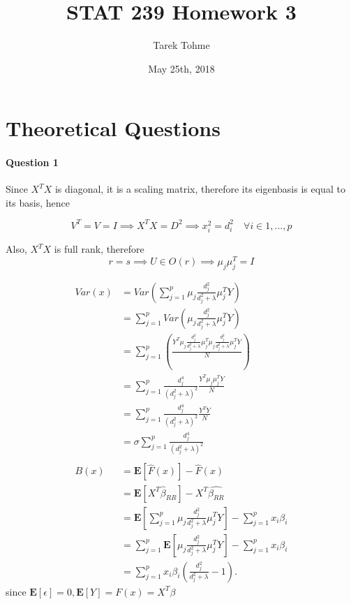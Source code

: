 \documentclass{article}
\begin{document}
\title{STAT 239 Homework 3}
\author{Tarek Tohme}
\date{May 25th, 2018}
\maketitle

\section{Theoretical Questions}
\paragraph{Question 1}

Since \(X^TX\) is diagonal, it is a scaling matrix, therefore its eigenbasis is equal to its basis, hence 

\begin{equation*}
V^T = V = I \implies X^TX = D^2 \implies x_i^2 = d_i^2 \quad \forall i \in {1,...,p}
\end{equation*}

Also, \(X^TX\) is full rank, therefore 
\begin{equation*}
r=s \implies U \in O(r) \implies \mu_j\mu_j^T = I
\end{equation*}

\begin{align*}
Var(x) & = Var\left(\sum_{j=1}^p\mu_j\frac{d_j^2}{d_j^2 + \lambda}\mu_j^TY\right)
\\
& = \sum_{j=1}^pVar\left(\mu_j\frac{d_j^2}{d_j^2 + \lambda}\mu_j^TY\right)
\\
& = \sum_{j=1}^p\left(\frac{Y^T\mu_j\frac{d_j^2}{d_j^2 + \lambda}\mu_j^T\mu_j\frac{d_j^2}{d_j^2 + \lambda}\mu_j^TY}{N}\right)
\\
& = \sum_{j=1}^p\frac{d_j^4}{\left(d_j^2 + \lambda\right)^2}\frac{Y^T\mu_j\mu_j^TY}{N}
\\
& = \sum_{j=1}^p\frac{d_j^4}{\left(d_j^2 + \lambda\right)^2}\frac{Y^TY}{N}
\\
& = \sigma \sum_{j=1}^p\frac{d_j^4}{\left(d_j^2 + \lambda\right)^2}
\\
\\
B(x) & = \mathbf{E}\left[\hat{F}(x)\right] - \hat{F}(x)
\\
& = \mathbf{E}\left[X^T\hat{\beta}_{RR}\right] - X^T\hat{\beta_{RR}}
\\
& = \mathbf{E}\left[\sum_{j=1}^p\mu_j\frac{d_j^2}{d_j^2 + \lambda}\mu_j^TY\right] - \sum_{j=1}^p x_i \beta_i
\\
& = \sum_{j=1}^p\mathbf{E}\left[\mu_j\frac{d_j^2}{d_j^2 + \lambda}\mu_j^TY\right] - \sum_{j=1}^p x_i \beta_i
\\
& = \sum_{j=1}^p x_i \beta_i \left(\frac{d_j^2}{d_j^2 + \lambda} - 1 \right)
.
\end{align*}
since \(\mathbf{E}[\epsilon] = 0, \mathbf{E}[Y] = F(x) = X^T \beta \)
\end{document}
